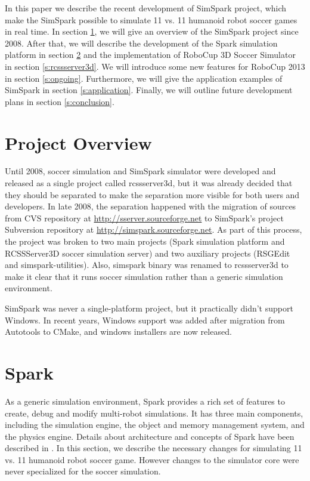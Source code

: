 \documentclass{llncs}
\begin{document}
In this paper we describe the recent development of SimSpark project, which make the SimSpark possible to simulate 11 vs. 11 humanoid robot soccer games in real time.
In section \ref{s:overview}, we will give an overview of the SimSpark project since 2008. After that, we will describe the development of the Spark simulation platform in section \ref{s:spark} and the implementation of RoboCup 3D Soccer Simulator in section \ref{s:rcssserver3d}.
We will introduce some new features for RoboCup 2013 in section \ref{s:ongoing}.
Furthermore, we will give the application examples of SimSpark in section \ref{s:application}.
Finally, we will outline future development plans in section \ref{s:conclusion}.

\section{Project Overview}
\label{s:overview}

Until 2008, soccer simulation and SimSpark simulator were developed and released as a single project called rcssserver3d, but it was already decided that they should be separated 
to make the separation more visible for both users and developers.
In late 2008, the separation happened with the migration of sources from CVS repository
at \url{http://sserver.sourceforge.net} to SimSpark's project Subversion repository at 
\url{http://simspark.sourceforge.net}. As part of this process, the project was broken
to two main projects (Spark simulation platform and RCSSServer3D soccer simulation server) 
and two auxiliary projects (RSGEdit and simspark-utilities). Also, simspark binary was 
renamed to rcssserver3d to make it clear that it runs soccer simulation rather than a 
generic simulation environment.

SimSpark was never a single-platform project, but it practically didn't support 
Windows. In recent years, Windows support was added after migration from Autotools
to CMake, and windows installers are now released. 

\section{Spark}
\label{s:spark}
As a generic simulation environment, Spark provides a rich set of features to create, debug and modify multi-robot simulations.
It has three main components, including the simulation engine, the object and memory management system, and the physics engine. Details about architecture and concepts of Spark have been described in \cite{Boedecker2008,OR05}.
In this section, we describe the necessary changes for simulating 11 vs. 11 humanoid robot soccer game.
However changes to the simulator core were never specialized for the soccer simulation.
\end{document}
